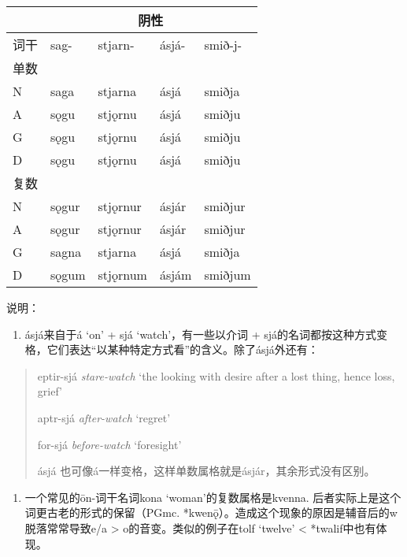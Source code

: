 \begin{longtable}{lllll}
  \toprule
       & \multicolumn{4}{c}{阴性}                              \\
  \midrule
  \endhead
  \bottomrule
  \endfoot
  词干 & sag-                     & stjarn-  & ásjá- & smið-j- \\
  单数 &                          &          &       &         \\
  N    & saga                     & stjarna  & ásjá  & smiðja  \\
  A    & sǫgu                     & stjǫrnu  & ásjá  & smiðju  \\
  G    & sǫgu                     & stjǫrnu  & ásjá  & smiðju  \\
  D    & sǫgu                     & stjǫrnu  & ásjá  & smiðju  \\
  复数 &                          &          &       &         \\
  N    & sǫgur                    & stjǫrnur & ásjár & smiðjur \\
  A    & sǫgur                    & stjǫrnur & ásjár & smiðjur \\
  G    & sagna                    & stjarna  & ásjá  & smiðja  \\
  D    & sǫgum                    & stjǫrnum & ásjám & smiðjum \\
\end{longtable}

说明：

\begin{enumerate}
  \def\labelenumi{\arabic{enumi})}
  \item
        ásjá来自于á `on' + sjá `watch'，有一些以介词 +
        sjá的名词都按这种方式变格，它们表达``以某种特定方式看''的含义。除了ásjá外还有：
\end{enumerate}

\begin{quote}
  eptir-sjá \emph{stare-watch} `the looking with desire after a lost
  thing, hence loss, grief'

  aptr-sjá \emph{after-watch} `regret'

  for-sjá \emph{before-watch} `foresight'

  ásjá 也可像á一样变格，这样单数属格就是ásjár，其余形式没有区别。
\end{quote}

\begin{enumerate}
  \def\labelenumi{\arabic{enumi})}
  \setcounter{enumi}{1}
  \item
        一个常见的ōn-词干名词kona `woman'的复数属格是kvenna.
        后者实际上是这个词更古老的形式的保留（PGmc.
        *kwenǭ）。造成这个现象的原因是辅音后的w脱落常常导致e/a \textgreater{}
        o的音变。类似的例子在tolf `twelve' \textless{} *twalif中也有体现。
\end{enumerate}

